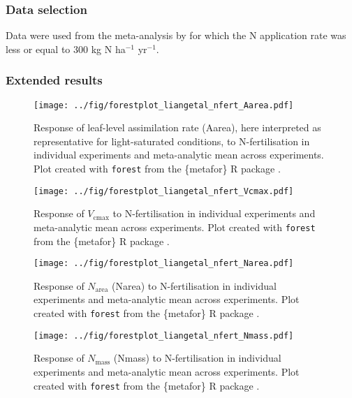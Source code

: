 \documentclass{myreport}
\begin{document}
\subsubsection{Data selection}

Data were used from the meta-analysis by \citet{liang_global_2020} for which the N application rate was less or equal to 300 kg N ha$^{-1}$ yr$^{-1}$.

\subsubsection{Extended results}

\begin{figure}[h]
\centering
\texttt{[image: ../fig/forestplot\_liangetal\_nfert\_Aarea.pdf]}
\caption{Response of leaf-level assimilation rate (Aarea), here interpreted as representative for light-saturated conditions, to N-fertilisation in individual experiments and meta-analytic mean across experiments. Plot created with \texttt{forest} from the \{metafor\} R package \cite{viechtbauer_conducting_2010}.}
\end{figure}

\begin{figure}[h]
\centering
\texttt{[image: ../fig/forestplot\_liangetal\_nfert\_Vcmax.pdf]}
\caption{Response of $V_\text{cmax}$ to N-fertilisation in individual experiments and meta-analytic mean across experiments. Plot created with \texttt{forest} from the \{metafor\} R package \cite{viechtbauer_conducting_2010}.}
\end{figure}

\begin{figure}[h]
\centering
\texttt{[image: ../fig/forestplot\_liangetal\_nfert\_Narea.pdf]}
\caption{Response of $N_\text{area}$ (Narea) to N-fertilisation in individual experiments and meta-analytic mean across experiments. Plot created with \texttt{forest} from the \{metafor\} R package \cite{viechtbauer_conducting_2010}.}
\end{figure}

\begin{figure}[h]
\centering
\texttt{[image: ../fig/forestplot\_liangetal\_nfert\_Nmass.pdf]}
\caption{Response of $N_\text{mass}$ (Nmass) to N-fertilisation in individual experiments and meta-analytic mean across experiments. Plot created with \texttt{forest} from the \{metafor\} R package \cite{viechtbauer_conducting_2010}.}
\end{figure}
\end{document}
